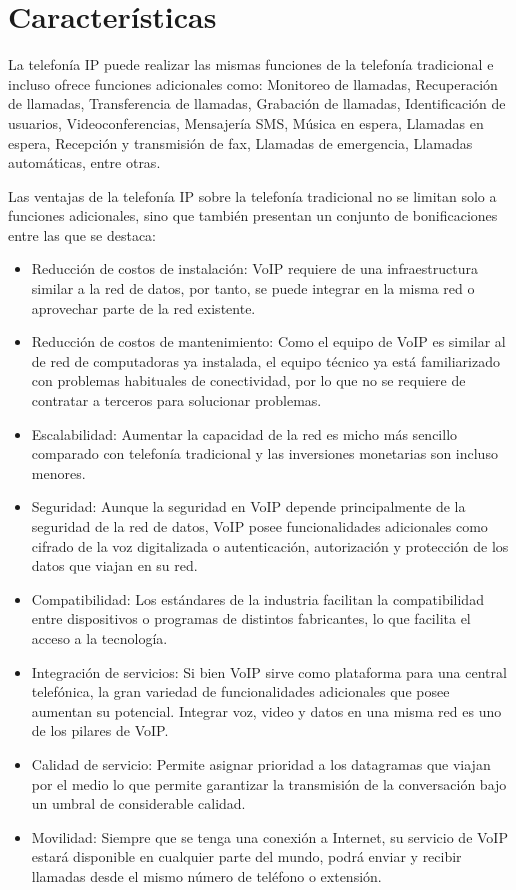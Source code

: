 \section{Características}

	La telefonía IP puede realizar las mismas funciones de la telefonía tradicional 
	e incluso ofrece funciones adicionales como: Monitoreo de llamadas, Recuperación 
	de llamadas, Transferencia de llamadas, Grabación de llamadas, Identificación de 
	usuarios, Videoconferencias, Mensajería SMS, Música en espera, Llamadas en espera, 
	Recepción y transmisión de fax, Llamadas de emergencia, Llamadas automáticas, 
	entre otras.
	
	Las ventajas de la telefonía IP sobre la telefonía tradicional no se limitan 
	solo a funciones adicionales, sino que también presentan un conjunto de 
	bonificaciones entre las que se destaca: 
	
	\begin{itemize}
		\item Reducción de costos de instalación: VoIP requiere de una infraestructura 
		similar a la red de datos, por tanto, se puede integrar en la misma red o 
		aprovechar parte de la red existente. 
		\item Reducción de costos de mantenimiento: Como el equipo de VoIP es similar 
		al de red de computadoras ya instalada, el equipo técnico ya está familiarizado 
		con problemas habituales de conectividad, por lo que no se requiere de contratar 
		a terceros para solucionar problemas.
		\item Escalabilidad: Aumentar la capacidad de la red es micho más sencillo 
		comparado con telefonía tradicional y las inversiones monetarias son incluso
		 menores.
		\item Seguridad: Aunque la seguridad  en VoIP depende principalmente de la 
		seguridad de la red de datos, VoIP posee funcionalidades adicionales como 
		cifrado de la voz digitalizada o autenticación, autorización y protección 
		de los datos que viajan en su red.
		\item Compatibilidad:  Los estándares de la industria facilitan la compatibilidad
		 entre dispositivos o programas de distintos fabricantes, lo que facilita el 
		 acceso a la tecnología.
		\item Integración de servicios: Si bien VoIP sirve como plataforma para una central 
		telefónica, la gran variedad de funcionalidades adicionales que posee aumentan su 
		potencial. Integrar voz, video y datos en una misma red es uno de los pilares
		 de VoIP.
		\item Calidad de servicio: Permite asignar prioridad a los datagramas que viajan 
		por el medio lo que permite garantizar la transmisión de la conversación bajo un 
		umbral de considerable calidad.
		\item Movilidad: Siempre que se tenga una conexión a Internet, su servicio de 
		VoIP estará disponible en cualquier parte del mundo, podrá enviar y recibir 
		llamadas desde el mismo número de teléfono o extensión. 
	\end{itemize}